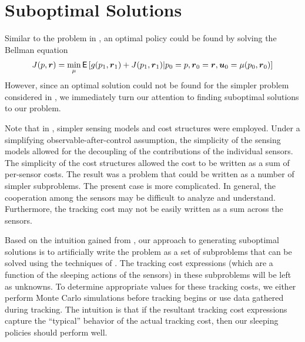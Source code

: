 \documentclass[journal,draftcls,onecolumn,11pt]{IEEEtran}
\newcommand{\emb}[1]{\text{\boldmath{$#1$}}}
\newcommand{\Expect}{\textsf{E}}
\begin{document}
\section{Suboptimal Solutions} \label{sec:subopt_sol}

Similar to the problem in \cite{fuemmeler08}, an optimal policy could be found by solving the Bellman equation
\begin{align} \label{eq:bellmanh}
   J(p,\emb{r}) = \min_{\mu} \Expect \left[ g(p_1,\emb{r}_1) + J(p_1,\emb{r}_1) | p_0=p, \emb{r}_0 = \emb{r}, \emb{u}_0 = \mu(p_0,\emb{r}_0) \right]
\end{align}
However, since an optimal solution could not be found for the simpler problem considered in \cite{fuemmeler08}, we immediately turn our attention to finding suboptimal solutions to our problem.

Note that in \cite{fuemmeler08}, simpler sensing models and cost structures were employed. Under a simplifying observable-after-control assumption, the simplicity of the sensing models allowed for the decoupling of the contributions of the individual sensors.  The simplicity of the cost structures allowed the cost to be written as a sum of per-sensor costs.  The result was a problem that could be written as a number of simpler subproblems. The present case is more complicated.  In general, the cooperation among the sensors may be difficult to analyze and understand.  Furthermore, the tracking cost may not be easily written as a sum across the sensors.

Based on the intuition gained from \cite{fuemmeler08}, our approach to generating suboptimal solutions is to artificially write the problem as a set of subproblems that can be solved using the techniques of \cite{fuemmeler08}. The tracking cost expressions (which are a function of the sleeping actions of the sensors) in these subproblems will be left as unknowns. To determine appropriate values for these tracking costs, we either perform Monte Carlo simulations before tracking begins or use data gathered during tracking.  The intuition is that if the resultant tracking cost expressions capture the ``typical'' behavior of the actual tracking cost, then our sleeping policies should perform well.
\end{document}
